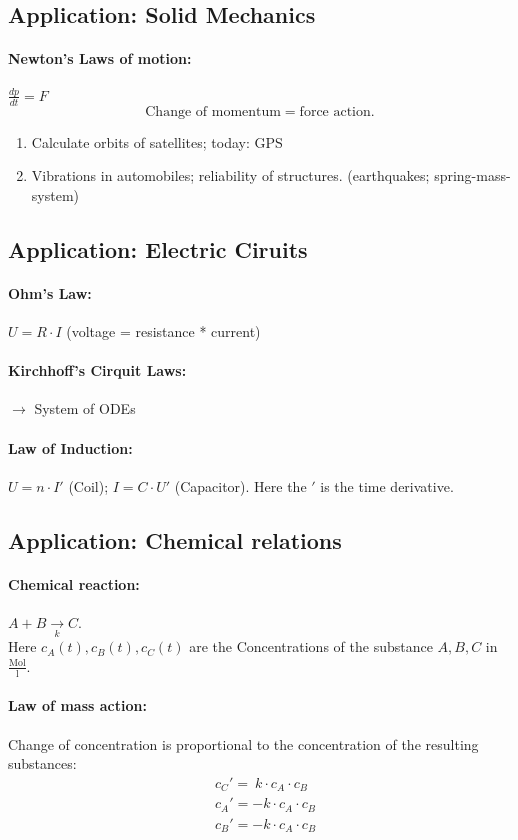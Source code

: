 \documentclass[]{article}
\begin{document}
	\subsection{Application: Solid Mechanics}
	\paragraph{Newton's Laws of motion:} $ \frac{dp}{dt}=F $ 
	\[
	\text{Change of momentum}= \text{force action}
	.\]
	\begin{enumerate}
		\renewcommand{\labelenumi}{\alph{enumi})}
		\item Calculate orbits of satellites; today: GPS
		\item Vibrations in automobiles; reliability of structures. (earthquakes; spring-mass-system)
	\end{enumerate}
	
	\subsection{Application: Electric Ciruits}
	\paragraph{Ohm's Law:} $ U=R \cdot I $ (voltage = resistance * current)
	\paragraph{Kirchhoff's Cirquit Laws:} $\rightarrow$ System of ODEs
	\paragraph{Law of Induction:} $ U=n \cdot I' $ (Coil); $ I = C \cdot U' $ (Capacitor). Here the $'$ is the time derivative.
	\subsection{Application: Chemical relations}
	\paragraph{Chemical reaction:} $ A+B\underset{k}\longrightarrow C $. \\  Here $c_A(t), c_B(t), c_C(t)$ are the Concentrations of the substance $A,B,C$ in $ \frac{ \text{Mol}}{\text{l}}$. 
	\paragraph{Law of mass action:} 
	Change of concentration is proportional to the concentration of the resulting substances:
	\[
	\begin{split}
		 & c_C'=~k \cdot c_A \cdot c_B \\
		 & c_A'=-k \cdot c_A \cdot c_B \\
		 & c_B'=-k \cdot c_A \cdot c_B \\
	\end{split}
	\]
\end{document}
